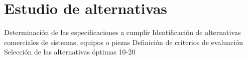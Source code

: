 \chapter{Estudio de alternativas}

Determinación de las especificaciones a cumplir
Identificación de alternativas comerciales de
sistemas, equipos o piezas
Definición de criterios de evaluación
Selección de las alternativas óptimas
10-20
